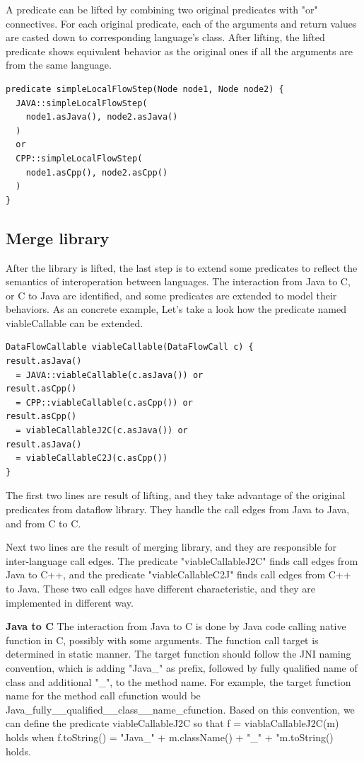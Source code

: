 A predicate can be lifted by combining two original predicates with "or"
connectives.  For each original predicate, each of the arguments and return
values are casted down to corresponding language's class. After lifting, the
lifted predicate shows equivalent behavior as the original ones if all the
arguments are from the same language.
\begin{lstlisting}[style=codeql,xleftmargin=2.5em]
predicate simpleLocalFlowStep(Node node1, Node node2) {
  JAVA::simpleLocalFlowStep(
    node1.asJava(), node2.asJava()
  )
  or
  CPP::simpleLocalFlowStep(
    node1.asCpp(), node2.asCpp()
  )
}
\end{lstlisting}
\subsection{Merge library}

After the library is lifted, the last step is to extend some predicates to
reflect the semantics of interoperation between languages. The interaction from
Java to C, or C to Java are identified, and some predicates are extended to
model their behaviors. As an concrete example, Let's take a look how the predicate
named viableCallable can be extended.
\begin{lstlisting}[style=codeql,xleftmargin=2.5em]
DataFlowCallable viableCallable(DataFlowCall c) {
result.asJava()
  = JAVA::viableCallable(c.asJava()) or
result.asCpp()
  = CPP::viableCallable(c.asCpp()) or
result.asCpp()
  = viableCallableJ2C(c.asJava()) or
result.asJava()
  = viableCallableC2J(c.asCpp())
}
\end{lstlisting}
The first two lines are result of lifting, and they take advantage of the
original predicates from dataflow library.  They handle the call edges from
Java to Java, and from C to C.

Next two lines are the result of merging library, and they are responsible for
inter-language call edges.  The predicate "viableCallableJ2C" finds call edges
from Java to C++, and the predicate "viableCallableC2J" finds call edges from
C++ to Java. These two call edges have different characteristic, and they
are implemented in different way.

\textbf{Java to C} The interaction from Java to C is done by Java code
calling native function in C, possibly with some arguments. The function
call target is determined in static manner. The target function should
follow the JNI naming convention, which is adding "Java\_" as prefix, 
followed by fully qualified name of class and additional "\_", to the
method name. For example, the target function name for the method call
cfunction would be Java\_fully\_\_qualified\_\_class\_\_name\_cfunction.
Based on this convention, we can define the predicate viableCallableJ2C
so that f = viablaCallableJ2C(m) holds when f.toString() = "Java\_" + 
m.className() + "\_" + "m.toString() holds. 

